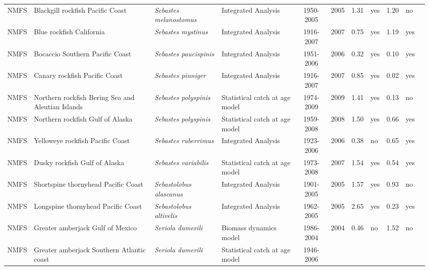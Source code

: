 \begin{longtable}{p{1.8cm}p{3.5cm}p{3.5cm}p{3cm}cccp{0.9cm}cp{0.9cm}c}
  NMFS & Blackgill rockfish  Pacific Coast & \textit{Sebastes melanostomus} & Integrated Analysis & 1950-2005 & 2005 & 1.31 & yes & 1.20 & no & \cite{2005-SAFE-Wcblackgill.pdf} \\ 
  NMFS & Blue rockfish California & \textit{Sebastes mystinus} & Integrated Analysis & 1916-2007 & 2007 & 0.75 & yes & 1.19 & yes & \cite{NWFSC-BLUEROCKCAL-2007-Blue rockfish CA.pdf} \\ 
  NMFS & Bocaccio Southern Pacific Coast & \textit{Sebastes paucispinis} & Integrated Analysis & 1951-2006 & 2006 & 0.32 & yes & 0.10 & yes & \cite{NWFSC-BOCACCSPCOAST-2007 Bocaccio.pdf} \\ 
  NMFS & Canary rockfish Pacific Coast & \textit{Sebastes pinniger} & Integrated Analysis & 1916-2007 & 2007 & 0.85 & yes & 0.02 & yes & \cite{NWFSC-CROCKPCOAST-2007-Canary.pdf} \\ 
  NMFS & Northern rockfish Bering Sea and Aleutian Islands & \textit{Sebastes polyspinis} & Statistical catch at age model & 1974-2009 & 2009 & 1.41 & yes & 0.13 & no & \cite{2008_SAFE_BSAInorthern.pdf} \\ 
  NMFS & Northern rockfish Gulf of Alaska & \textit{Sebastes polyspinis} & Statistical catch at age model & 1959-2008 & 2008 & 1.50 & yes & 0.66 & yes & \cite{AFSC-NROCKGA-2008-Northern rockfish GA.pdf} \\ 
  NMFS & Yelloweye rockfish Pacific Coast & \textit{Sebastes ruberrimus} & Integrated Analysis & 1923-2006 & 2006 & 0.38 & no & 0.65 & yes & \cite{NWFSC-YEYEROCKPCOAST-2007-yelloweye.pdf} \\ 
  NMFS & Dusky rockfish Gulf of Alaska & \textit{Sebastes variabilis} & Statistical catch at age model & 1973-2008 & 2007 & 1.54 & yes & 0.54 & yes & \cite{AFSC-DUSROCKGA-2008-Dusky rockfish GA.pdf} \\ 
  NMFS & Shortspine thornyhead Pacific Coast & \textit{Sebastolobus alascanus} & Integrated Analysis & 1901-2005 & 2005 & 1.57 & yes & 0.93 & no & \cite{2005-SST-assessment.pdf} \\ 
  NMFS & Longspine thornyhead Pacific Coast & \textit{Sebastolobus altivelis} & Integrated Analysis & 1962-2005 & 2005 & 2.65 & yes & 0.23 & yes & \cite{2005-SAFE-Longspine.pdf} \\ 
  NMFS & Greater amberjack Gulf of Mexico & \textit{Seriola dumerili} & Biomass dynamics model & 1986-2004 & 2004 & 0.46 & no & 1.52 & no & \cite{JENSEN_GRAMBERGM_2006.pdf} \\ 
  NMFS & Greater amberjack Southern Atlantic coast & \textit{Seriola dumerili} & Statistical catch at age model & 1946-2006 &  &  &  &  &  & \cite{JENSEN_GRAMBERSATLC_2008.pdf} \\ 

\end{longtable}
